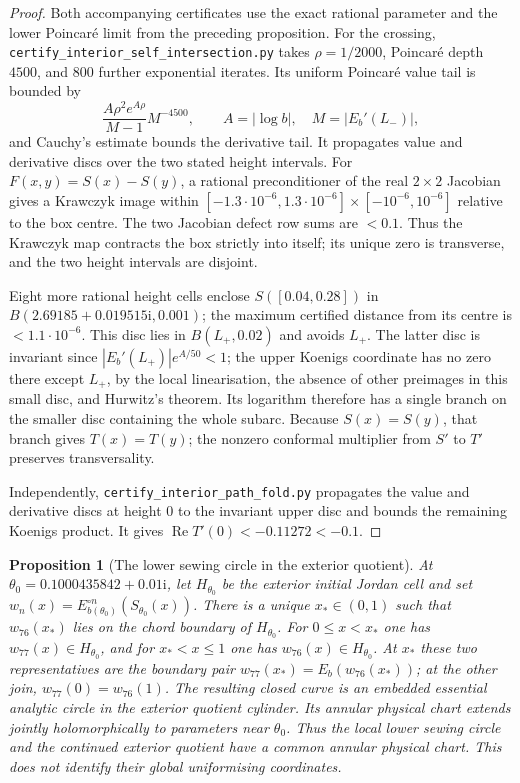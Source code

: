 \documentclass[11pt,a4paper]{article}
\newtheorem{proposition}[theorem]{Proposition}
\theoremstyle{definition}
\newcommand{\ii}{\mathrm{i}}
\begin{document}
\begin{proof}
Both accompanying certificates use the exact rational parameter and
the lower Poincar\'e limit from the preceding proposition.  For the
crossing, \nolinkurl{certify_interior_self_intersection.py} takes
$\rho=1/2000$, Poincar\'e depth $4500$, and $800$ further
exponential iterates.  Its uniform Poincar\'e value tail is bounded by
\[
 \frac{A\rho^2e^{A\rho}}{M-1}M^{-4500},\qquad
 A=|\log b|,\quad M=|E_b'(L_-)|,
\]
and Cauchy's estimate bounds the derivative tail.  It propagates
value and derivative discs over the two stated height intervals.
For $F(x,y)=S(x)-S(y)$, a rational preconditioner of the real
$2\times2$ Jacobian gives a Krawczyk image within
$[-1.3\cdot10^{-6},1.3\cdot10^{-6}]\times[-10^{-6},10^{-6}]$
relative to the box centre.  The two Jacobian defect row sums are
$<0.1$.  Thus the Krawczyk map contracts the box strictly into
itself; its unique zero is transverse, and the two height intervals
are disjoint.

Eight more rational height cells enclose $S([0.04,0.28])$ in
$B(2.69185+0.019515\ii,0.001)$; the maximum certified distance
from its centre is $<1.1\cdot10^{-6}$.  This disc lies in
$B(L_+,0.02)$ and avoids $L_+$.  The latter disc is invariant since
$|E_b'(L_+)|e^{A/50}<1$; the upper Koenigs coordinate has no zero
there except $L_+$, by the local linearisation, the absence of other
preimages in this small disc, and Hurwitz's theorem.  Its logarithm
therefore has a single branch on the smaller disc containing the
whole subarc.  Because $S(x)=S(y)$, that branch gives $T(x)=T(y)$;
the nonzero conformal multiplier from $S'$ to $T'$ preserves
transversality.

Independently, \nolinkurl{certify_interior_path_fold.py} propagates
the value and derivative discs at height $0$ to the invariant upper
disc and bounds the remaining Koenigs product.  It gives
$\operatorname{Re}T'(0)<-0.11272<-0.1$.
\end{proof}

\begin{proposition}[The lower sewing circle in the exterior quotient]
\label{prop:interior-quotient-loop}
At $\theta_0=0.1000435842+0.01\ii$, let $H_{\theta_0}$ be the
exterior initial Jordan cell and set
$w_n(x)=E_{b(\theta_0)}^{\circ n}(S_{\theta_0}(x))$.
There is a unique $x_*\in(0,1)$ such that
$w_{76}(x_*)$ lies on the chord boundary of $H_{\theta_0}$.
For $0\le x<x_*$ one has $w_{77}(x)\in H_{\theta_0}$, and for
$x_*<x\le1$ one has $w_{76}(x)\in H_{\theta_0}$.
At $x_*$ these two representatives are the boundary pair
$w_{77}(x_*)=E_b(w_{76}(x_*))$; at the other join,
$w_{77}(0)=w_{76}(1)$.  The resulting closed curve is an embedded
essential analytic circle in the exterior quotient cylinder.
Its annular physical chart extends jointly holomorphically to
parameters near $\theta_0$.  Thus the local lower sewing circle and the
continued exterior quotient have a common annular physical chart.
This does not identify their global uniformising coordinates.
\end{proposition}
\end{document}
